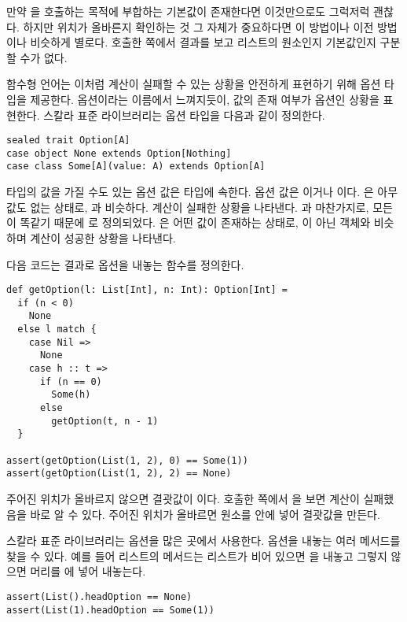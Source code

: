 만약 을 호출하는 목적에 부합하는 기본값이 존재한다면 이것만으로도
그럭저럭 괜찮다. 하지만 위치가 올바른지 확인하는 것 그 자체가 중요하다면 이
방법이나 이전 방법이나 비슷하게 별로다. 호출한 쪽에서 결과를 보고 리스트의
원소인지 기본값인지 구분할 수가 없다.

함수형 언어는 이처럼 계산이 실패할 수 있는 상황을 안전하게 표현하기 위해 옵션
타입을 제공한다. 옵션이라는 이름에서 느껴지듯이, 값의 존재 여부가 옵션인 상황을
표현한다. 스칼라 표준 라이브러리는 옵션 타입을 다음과 같이 정의한다.

\begin{verbatim}
sealed trait Option[A]
case object None extends Option[Nothing]
case class Some[A](value: A) extends Option[A]
\end{verbatim}

 타입의 값을 가질 수도 있는 옵션 값은  타입에 속한다.
옵션 값은 이거나 이다. 은 아무 값도 없는
상태로, 과 비슷하다. 계산이 실패한 상황을 나타낸다. 과
마찬가지로, 모든 이 똑같기 때문에 로 정의되었다.
은 어떤 값이 존재하는 상태로, 이 아닌 객체와 비슷하며 계산이 성공한 상황을 나타낸다.

다음 코드는 결과로 옵션을 내놓는  함수를 정의한다.

\begin{verbatim}
def getOption(l: List[Int], n: Int): Option[Int] =
  if (n < 0)
    None
  else l match {
    case Nil =>
      None
    case h :: t =>
      if (n == 0)
        Some(h)
      else
        getOption(t, n - 1)
  }

assert(getOption(List(1, 2), 0) == Some(1))
assert(getOption(List(1, 2), 2) == None)
\end{verbatim}

주어진 위치가 올바르지 않으면 결괏값이 이다. 호출한 쪽에서
을 보면 계산이 실패했음을 바로 알 수 있다. 주어진 위치가 올바르면
원소를  안에 넣어 결괏값을 만든다.

스칼라 표준 라이브러리는 옵션을 많은 곳에서 사용한다. 옵션을 내놓는 여러
메서드를 찾을 수 있다. 예를 들어 리스트의  메서드는 리스트가
비어 있으면 을 내놓고 그렇지 않으면 머리를 에 넣어 내놓는다.

\begin{verbatim}
assert(List().headOption == None)
assert(List(1).headOption == Some(1))
\end{verbatim}

